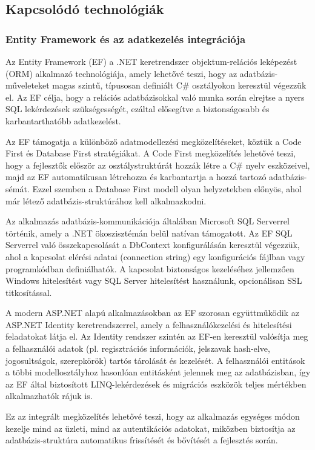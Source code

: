 \subsection{Kapcsolódó technológiák}

\subsubsection{Entity Framework és az adatkezelés integrációja}

\indent Az Entity Framework (EF) a .NET keretrendszer objektum-relációs leképezést (ORM) alkalmazó technológiája, amely lehetővé teszi, hogy az adatbázis-műveleteket magas szintű, típusosan definiált C\# osztályokon keresztül végezzük el. Az EF célja, hogy a relációs adatbázisokkal való munka során elrejtse a nyers SQL lekérdezések szükségességét, ezáltal elősegítve a biztonságosabb és karbantarthatóbb adatkezelést.

Az EF támogatja a különböző adatmodellezési megközelítéseket, köztük a Code First és Database First stratégiákat. A Code First megközelítés lehetővé teszi, hogy a fejlesztők először az osztálystruktúrát hozzák létre a C\# nyelv eszközeivel, majd az EF automatikusan létrehozza és karbantartja a hozzá tartozó adatbázis-sémát. Ezzel szemben a Database First modell olyan helyzetekben előnyös, ahol már létező adatbázis-struktúrához kell alkalmazkodni.

Az alkalmazás adatbázis-kommunikációja általában Microsoft SQL Serverrel történik, amely a .NET ökoszisztémán belül natívan támogatott. Az EF SQL Serverrel való összekapcsolását a DbContext konfigurálásán keresztül végezzük, ahol a kapcsolat elérési adatai (connection string) egy konfigurációs fájlban vagy programkódban definiálhatók. A kapcsolat biztonságos kezeléséhez jellemzően Windows hitelesítést vagy SQL Server hitelesítést használunk, opcionálisan SSL titkosítással.

A modern ASP.NET alapú alkalmazásokban az EF szorosan együttműködik az ASP.NET Identity keretrendszerrel, amely a felhasználókezelési és hitelesítési feladatokat látja el. Az Identity rendszer szintén az EF-en keresztül valósítja meg a felhasználói adatok (pl. regisztrációs információk, jelszavak hash-elve, jogosultságok, szerepkörök) tartós tárolását és kezelését. A felhasználói entitások a többi modellosztályhoz hasonlóan entitásként jelennek meg az adatbázisban, így az EF által biztosított LINQ-lekérdezések és migrációs eszközök teljes mértékben alkalmazhatók rájuk is.

Ez az integrált megközelítés lehetővé teszi, hogy az alkalmazás egységes módon kezelje mind az üzleti, mind az autentikációs adatokat, miközben biztosítja az adatbázis-struktúra automatikus frissítését és bővítését a fejlesztés során.

